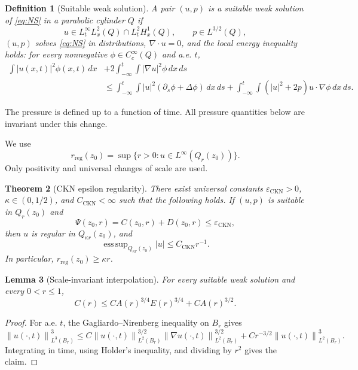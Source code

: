 \documentclass[pdflatex,sn-mathphys-num]{sn-jnl}
\numberwithin{equation}{section}
\theoremstyle{thmstyleone}
\newtheorem{theorem}{Theorem}[section]
\newtheorem{lemma}[theorem]{Lemma}
\theoremstyle{thmstylethree}
\newtheorem{definition}[theorem]{Definition}
\DeclareMathOperator*{\esssup}{ess\,sup}
\newcommand{\eps}{\varepsilon}
\newcommand{\reg}{\mathrm{reg}}
\newcommand{\CKN}{\mathrm{CKN}}
\newcommand{\dx}{\,dx}
\newcommand{\dxds}{\,dx\,ds}
\newcommand{\norm}[2]{\left\|#1\right\|_{#2}}
\begin{document}
\begin{definition}[Suitable weak solution]
A pair \((u,p)\) is a suitable weak solution of \eqref{eq:NS} in a parabolic cylinder \(Q\) if
\[
        u\in L^\infty_tL^2_x(Q)\cap L^2_tH^1_x(Q),
        \qquad
        p\in L^{3/2}(Q),
\]
\((u,p)\) solves \eqref{eq:NS} in distributions, \(\nabla\cdot u=0\), and the local energy inequality holds: for every nonnegative \(\phi\in C_c^\infty(Q)\) and a.e. \(t\),
\begin{equation}
\begin{aligned}
\int |u(x,t)|^2\phi(x,t)\dx
&+2\int_{-\infty}^t\int |\nabla u|^2\phi\dxds \\
&\le
\int_{-\infty}^t\int |u|^2(\partial_s\phi+\Delta\phi)\dxds
+\int_{-\infty}^t\int (|u|^2+2p)u\cdot\nabla\phi\dxds.
\end{aligned}
\label{eq:LEI}
\end{equation}
\end{definition}

The pressure is defined up to a function of time.  All pressure quantities below are invariant under this change.

We use
\[
        r_{\reg}(z_0)=\sup\{r>0:u\in L^\infty(Q_r(z_0))\}.
\]
Only positivity and universal changes of scale are used.

\begin{theorem}[CKN epsilon regularity]
\label{thm:CKN}
There exist universal constants \(\eps_{\CKN}>0\), \(\kappa\in(0,1/2)\), and \(C_{\CKN}<\infty\) such that the following holds.  If \((u,p)\) is suitable in \(Q_r(z_0)\) and
\[
        \Psi(z_0,r)=C(z_0,r)+D(z_0,r)\le\eps_{\CKN},
\]
then \(u\) is regular in \(Q_{\kappa r}(z_0)\), and
\[
        \esssup_{Q_{\kappa r}(z_0)}|u|
        \le C_{\CKN}r^{-1}.
\]
In particular, \(r_{\reg}(z_0)\ge \kappa r\).
\end{theorem}

\begin{lemma}[Scale-invariant interpolation]
\label{lem:interp}
For every suitable weak solution and every \(0<r\le1\),
\[
        C(r)\le C A(r)^{3/4}E(r)^{3/4}+C A(r)^{3/2}.
\]
\end{lemma}

\begin{proof}
For a.e. \(t\), the Gagliardo--Nirenberg inequality on \(B_r\) gives
\[
\norm{u(\cdot,t)}{L^3(B_r)}^3
\le C\norm{u(\cdot,t)}{L^2(B_r)}^{3/2}
       \norm{\nabla u(\cdot,t)}{L^2(B_r)}^{3/2}
+Cr^{-3/2}\norm{u(\cdot,t)}{L^2(B_r)}^3.
\]
Integrating in time, using Holder's inequality, and dividing by \(r^2\) gives the claim.
\end{proof}
\end{document}
